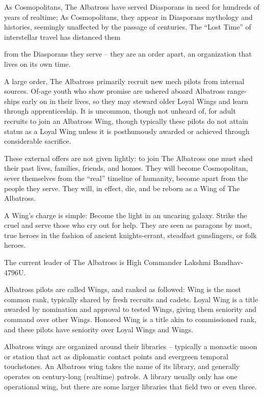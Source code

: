 As Cosmopolitans, The Albatross have served Diasporans in need for hundreds of years of
realtime; As Cosmopolitans, they appear in Diasporans mythology and histories, seemingly
unaffected by the passage of centuries. The “Lost Time” of interstellar travel has distanced them




from the Diasporans they serve -- they are an order apart, an organization that lives on its own
time.


A large order, The Albatross primarily recruit new mech pilots from internal sources. Of-age youth
who show promise are ushered aboard Albatross range-ships early on in their lives, so they may
steward older Loyal Wings and learn through apprenticeship. It is uncommon, though not
unheard of, for adult recruits to join an Albatross Wing, though typically these pilots do not attain
status as a Loyal Wing unless it is posthumously awarded or achieved through considerable
sacrifice.


These external offers are not given lightly: to join The Albatross one must shed their past lives,
families, friends, and homes. They will become Cosmopolitan, sever themselves from the “real”
timeline of humanity, become apart from the people they serve. They will, in effect, die, and be
reborn as a Wing of The Albatross.


A Wing’s charge is simple: Become the light in an uncaring galaxy. Strike the cruel and serve
those who cry out for help. They are seen as paragons by most, true heroes in the fashion of
ancient knights-errant, steadfast gunslingers, or folk heroes.


The current leader of The Albatross is High Commander Lakshmi Bandhav-4796U.


Albatross pilots are called Wings, and ranked as followed: Wing is the most common rank,
typically shared by fresh recruits and cadets. Loyal Wing is a title awarded by nomination and
approval to tested Wings, giving them seniority and command over other Wings. Honored Wing
is a title akin to commissioned rank, and these pilots have seniority over Loyal Wings and Wings.


Albatross wings are organized around their libraries -- typically a monastic moon or station that
act as diplomatic contact points and evergreen temporal touchstones. An Albatross wing takes
the name of its library, and generally operates on century-long (realtime) patrols. A library usually
only has one operational wing, but there are some larger libraries that field two or even three.


